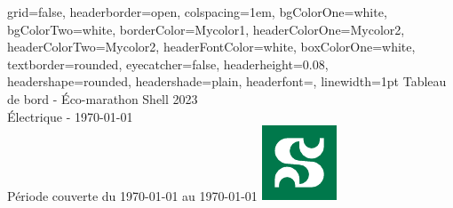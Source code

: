\documentclass[a0paper,portrait]{baposter}
\begin{document}

\begin{poster}
{
grid=false,
headerborder=open, %
colspacing=1em, %
bgColorOne=white, %
bgColorTwo=white, %
borderColor=Mycolor1, %
headerColorOne=Mycolor2, %
headerColorTwo=Mycolor2, %
headerFontColor=white, %
boxColorOne=white, %
textborder=rounded, %
eyecatcher=false, %
headerheight=0.08\textheight, %
headershape=rounded, %
headershade=plain,
headerfont=\Large\textsf, %
linewidth=1pt %
}
{}
%
%
{\textsf{{Tableau de bord - Éco-marathon Shell 2023}}} %
{\sf\vspace{0.1em}\\
Électrique  -  {\AdvanceDate[1]\today} 
\vspace{0.1em}\\
\small{ Période couverte du {\AdvanceDate[-7]\today} au {\AdvanceDate[0]\today}
}
}
{\includegraphics[width=.1\linewidth]{img/udes.pdf}} %

\end{poster}
\end{document}

